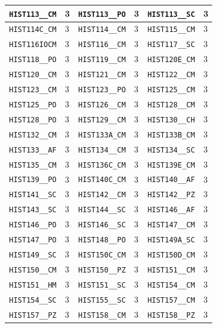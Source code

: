 \begin{longtable}{|l|l||l|l||l|l|}
    \verb|HIST113__CM| & 3 & \verb|HIST113__PO| & 3 & \verb|HIST113__SC| & 3\\\hline
    \verb|HIST114C_CM| & 3 & \verb|HIST114__CM| & 3 & \verb|HIST115__CM| & 3\\\hline
    \verb|HIST116IOCM| & 3 & \verb|HIST116__CM| & 3 & \verb|HIST117__SC| & 3\\\hline
    \verb|HIST118__PO| & 3 & \verb|HIST119__CM| & 3 & \verb|HIST120E_CM| & 3\\\hline
    \verb|HIST120__CM| & 3 & \verb|HIST121__CM| & 3 & \verb|HIST122__CM| & 3\\\hline
    \verb|HIST123__CM| & 3 & \verb|HIST123__PO| & 3 & \verb|HIST125__CM| & 3\\\hline
    \verb|HIST125__PO| & 3 & \verb|HIST126__CM| & 3 & \verb|HIST128__CM| & 3\\\hline
    \verb|HIST128__PO| & 3 & \verb|HIST129__CM| & 3 & \verb|HIST130__CH| & 3\\\hline
    \verb|HIST132__CM| & 3 & \verb|HIST133A_CM| & 3 & \verb|HIST133B_CM| & 3\\\hline
    \verb|HIST133__AF| & 3 & \verb|HIST134__CM| & 3 & \verb|HIST134__SC| & 3\\\hline
    \verb|HIST135__CM| & 3 & \verb|HIST136C_CM| & 3 & \verb|HIST139E_CM| & 3\\\hline
    \verb|HIST139__PO| & 3 & \verb|HIST140C_CM| & 3 & \verb|HIST140__AF| & 3\\\hline
    \verb|HIST141__SC| & 3 & \verb|HIST142__CM| & 3 & \verb|HIST142__PZ| & 3\\\hline
    \verb|HIST143__SC| & 3 & \verb|HIST144__SC| & 3 & \verb|HIST146__AF| & 3\\\hline
    \verb|HIST146__PO| & 3 & \verb|HIST146__SC| & 3 & \verb|HIST147__CM| & 3\\\hline
    \verb|HIST147__PO| & 3 & \verb|HIST148__PO| & 3 & \verb|HIST149A_SC| & 3\\\hline
    \verb|HIST149__SC| & 3 & \verb|HIST150C_CM| & 3 & \verb|HIST150D_CM| & 3\\\hline
    \verb|HIST150__CM| & 3 & \verb|HIST150__PZ| & 3 & \verb|HIST151__CM| & 3\\\hline
    \verb|HIST151__HM| & 3 & \verb|HIST151__SC| & 3 & \verb|HIST154__CM| & 3\\\hline
    \verb|HIST154__SC| & 3 & \verb|HIST155__SC| & 3 & \verb|HIST157__CM| & 3\\\hline
    \verb|HIST157__PZ| & 3 & \verb|HIST158__CM| & 3 & \verb|HIST158__PZ| & 3\\\hline

\end{longtable}
